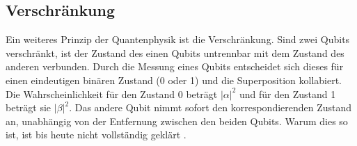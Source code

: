 \newpage
\subsection{Verschränkung}
Ein weiteres Prinzip der Quantenphysik ist die Verschränkung.
Sind zwei Qubits verschränkt, ist der Zustand des einen Qubits untrennbar mit dem Zustand des anderen verbunden.
Durch die Messung eines Qubits entscheidet sich dieses für einen eindeutigen binären Zustand (0 oder 1) und die Superposition kollabiert. 
Die Wahrscheinlichkeit für den Zustand 0 beträgt $|\alpha|^2$ und für den Zustand 1 beträgt sie $|\beta|^2$.
Das andere Qubit nimmt sofort den korrespondierenden Zustand an, unabhängig von der Entfernung zwischen den beiden Qubits. 
Warum dies so ist, ist bis heute nicht vollständig geklärt \cite{bashiri2025quantencomputing}.

